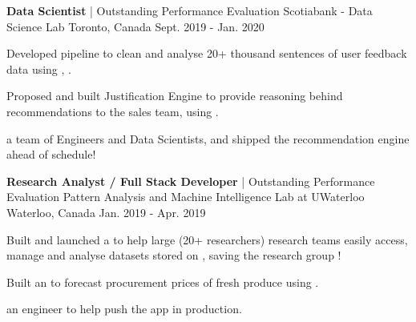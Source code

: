 \begin{cventries}
  \cventry
    {\textbf{Data Scientist} | Outstanding Performance Evaluation} %
    {Scotiabank - Data Science Lab} %
    {Toronto, Canada} %
    {Sept. 2019 - Jan. 2020} %
    {
      \begin{cvitems} %
        \item {Developed pipeline to clean and analyse 20+ thousand sentences of user feedback data using , .}
        \item {Proposed and built Justification Engine to provide reasoning behind recommendations to the sales team, using .}
        \item { a team of Engineers and Data Scientists, and shipped the recommendation engine  ahead of schedule!}
      \end{cvitems}
    }

  \cventry
    {\textbf{Research Analyst / Full Stack Developer} | Outstanding Performance Evaluation} %
    {Pattern Analysis and Machine Intelligence Lab at UWaterloo} %
    {Waterloo, Canada} %
    {Jan. 2019 - Apr. 2019} %
    {
      \begin{cvitems} %
        \item {Built and launched a  to help large (20+ researchers) research teams easily access, manage and analyse datasets stored on , saving the research group !}
		\item {Built an  to forecast procurement prices of fresh produce using .}
        \item { an engineer to help push the app in production.}
      \end{cvitems}
    }
\end{cventries}
